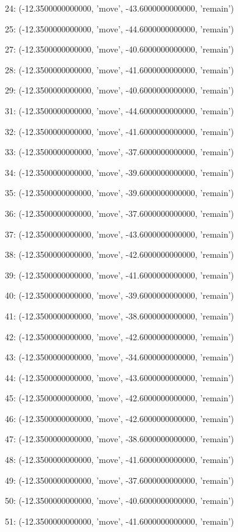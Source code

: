 24: (-12.3500000000000, 'move', -43.6000000000000, 'remain')


25: (-12.3500000000000, 'move', -44.6000000000000, 'remain')


27: (-12.3500000000000, 'move', -40.6000000000000, 'remain')


28: (-12.3500000000000, 'move', -41.6000000000000, 'remain')


29: (-12.3500000000000, 'move', -40.6000000000000, 'remain')


31: (-12.3500000000000, 'move', -44.6000000000000, 'remain')


32: (-12.3500000000000, 'move', -41.6000000000000, 'remain')


33: (-12.3500000000000, 'move', -37.6000000000000, 'remain')


34: (-12.3500000000000, 'move', -39.6000000000000, 'remain')


35: (-12.3500000000000, 'move', -39.6000000000000, 'remain')


36: (-12.3500000000000, 'move', -37.6000000000000, 'remain')


37: (-12.3500000000000, 'move', -43.6000000000000, 'remain')


38: (-12.3500000000000, 'move', -42.6000000000000, 'remain')


39: (-12.3500000000000, 'move', -41.6000000000000, 'remain')


40: (-12.3500000000000, 'move', -39.6000000000000, 'remain')


41: (-12.3500000000000, 'move', -38.6000000000000, 'remain')


42: (-12.3500000000000, 'move', -42.6000000000000, 'remain')


43: (-12.3500000000000, 'move', -34.6000000000000, 'remain')


44: (-12.3500000000000, 'move', -43.6000000000000, 'remain')


45: (-12.3500000000000, 'move', -42.6000000000000, 'remain')


46: (-12.3500000000000, 'move', -42.6000000000000, 'remain')


47: (-12.3500000000000, 'move', -38.6000000000000, 'remain')


48: (-12.3500000000000, 'move', -41.6000000000000, 'remain')


49: (-12.3500000000000, 'move', -37.6000000000000, 'remain')


50: (-12.3500000000000, 'move', -40.6000000000000, 'remain')


51: (-12.3500000000000, 'move', -41.6000000000000, 'remain')


